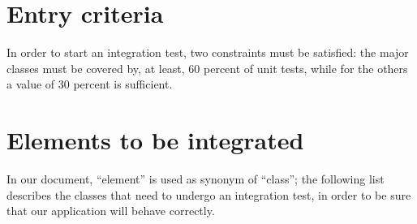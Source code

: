 \section{Entry criteria}
In order to start an integration test, two constraints must be satisfied:
the major classes must be covered by, at least, 60 percent of unit tests, 
while for the others a value of 30 percent is sufficient.

\section{Elements to be integrated}
In our document, ``element'' is used as synonym of ``class'';
the following list describes the classes that need to undergo an integration test, 
in order to be sure that our application will behave correctly.
